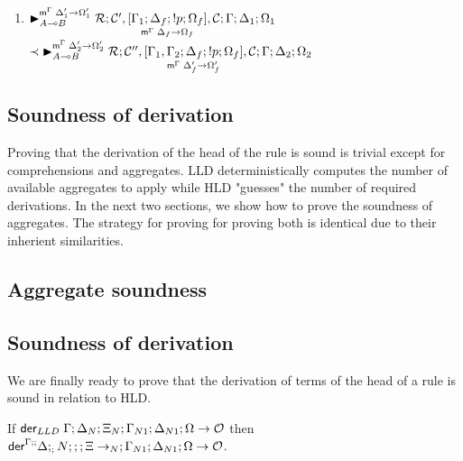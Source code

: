 \begin{enumerate}[leftmargin=*]
   \item $\matstate{A \lolli B}{\rulestk}{\lstack{C'},
      \pframe{\Gamma_1}{\Delta_f}{\bang p}{\Omega_f}{\Delta_f}{\Omega_f},
   \lstack{C}}{\Gamma}{\Delta_1}{\Omega_1}{\Delta'_1 \rightarrow \Omega'_1}$\\
   \hspace*{1cm} $\prec \matstate{A \lolli B}{\rulestk}{\lstack{C''},
      \pframe{\Gamma_1, \Gamma_2}{\Delta_f}{\bang p}{\Omega_f}{\Delta'_f}{\Omega'_f},
      \lstack{C}}{\Gamma}{\Delta_2}{\Omega_2}{\Delta'_2 \rightarrow \Omega'_2}$

\end{enumerate}

\subsection{Soundness of derivation}

Proving that the derivation of the head of the rule is sound is trivial except
for comprehensions and aggregates. LLD deterministically computes the number of
available aggregates to apply while HLD "guesses" the number of required
derivations.  In the next two sections, we show how to prove the soundness of
aggregates. The strategy for proving for proving both is identical due to their
inherient similarities.

\subsection{Aggregate soundness}



\iffalse
\subsection{Soundness of derivation}

We are finally ready to prove that the derivation of terms of the head of a rule
is sound in relation to HLD.

\begin{lemma}\label{thm:head_derivation_soundness}
If $\done \Gamma; \Delta_N; \Xi_N; \Gamma_{N1}; \Delta_{N1}; \Omega \rightarrow \outsem$ then
$\dz \Gamma; \Delta_N; \Xi_N; \Gamma_{N1}; \Delta_{N1}; \Omega \rightarrow \outsem$.
\end{lemma}

